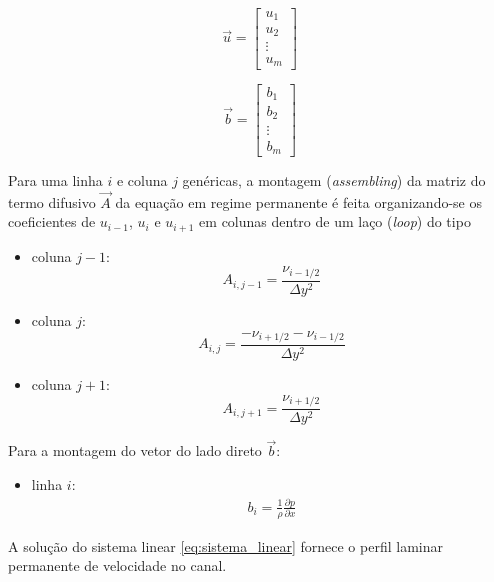\begin{equation}
	\vec{u} = \left[
	\begin{array}{c}
		u_{1}\\
		u_{2}\\
		\vdots\\
		u_{m}
	\end{array}
	\right]
\end{equation}

\begin{equation}
	\vec{b} = \left[
	\begin{array}{c}
		b_{1}\\
		b_{2}\\
		\vdots\\
		b_{m}
		\end{array}
	\right]
\end{equation}

Para uma linha $i$ e coluna $j$ genéricas, a montagem (\emph{assembling}) da matriz do termo difusivo $\vec{A}$ da
equação em regime permanente é feita organizando-se os coeficientes de $u_{i-1}$, $u_i$ e
$u_{i+1}$ em colunas %
dentro de um laço (\emph{loop}) do tipo

\begin{itemize}
	\item{coluna $j-1$:}
		\begin{equation}
			A_{i,j-1} = \frac{\nu_{i-1/2}}{\Delta y^2}
		\end{equation}
	\item{coluna $j$:}
		\begin{equation}
			A_{i,j} = \frac{-\nu_{i+1/2}-\nu_{i-1/2}}{\Delta y^2}
		\end{equation}
	\item{coluna $j+1$:}
		\begin{equation}
			A_{i,j+1} = \frac{\nu_{i+1/2}}{\Delta y^2}
		\end{equation}
\end{itemize}

Para a montagem do vetor do lado direto $\vec{b}$:

\begin{itemize}
	\item{linha $i$:}
		\begin{eqnarray}
			b_i=\frac{1}{\rho}\frac{\partial p}{\partial x} 
		\end{eqnarray}
\end{itemize}

A solução do sistema linear \ref{eq:sistema_linear} fornece o perfil laminar permanente de velocidade no canal.

